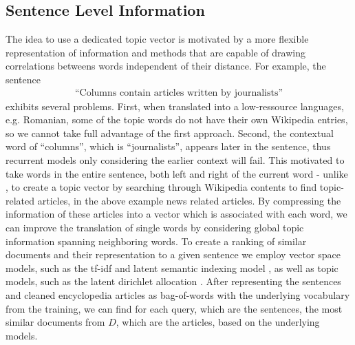 \documentclass[a4paper]{article}
\begin{document}
\subsection{Sentence Level Information} \label{sec:sentence-level}
The idea to use a dedicated topic vector is motivated by a more flexible representation of information and methods that are capable of drawing correlations betweens words independent of their distance.
For example, the sentence 
\begin{align}
\text{``Columns contain articles written by journalists''}
\end{align}
exhibits several problems. First, when translated into a low-ressource languages, e.g. Romanian, some of the topic words do not have their own Wikipedia entries, so we cannot take full advantage of the first approach. Second, the contextual word of ``columns'', which is ``journalists'', appears later in the sentence, thus recurrent models only considering the earlier context will fail. 
This motivated to take words in the entire sentence, both left and right of the current word -  unlike \cite{mikolov2012context}, to create a topic vector by searching through Wikipedia contents to find topic-related articles, in the above example news related articles. By compressing the information of these articles into a vector which is associated with each word, we can improve the translation of single words by considering global topic information spanning neighboring words. 
To create a ranking of similar documents and their representation to a given sentence we employ vector space models, such as the tf-idf \cite{salton1986introduction} and latent semantic indexing model \cite{bradford2008empirical}, as well as topic models, such as the latent dirichlet allocation \cite{blei2003latent}. After representing the sentences and cleaned encyclopedia articles as bag-of-words with the underlying vocabulary from the training, we can find for each query, which are the sentences, the most similar documents from $D$, which are the articles,  based on the underlying models.
\end{document}
